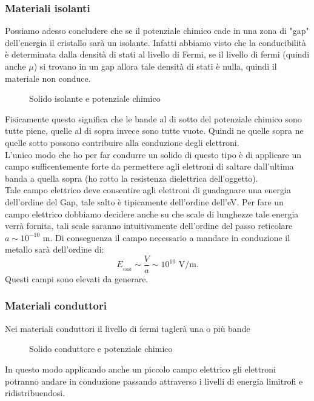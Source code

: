 \subsubsection{Materiali isolanti}
\label{subsubsec:Materiali isolanti}
Possiamo adesso concludere che se il potenziale chimico cade in una zona di "gap" dell'energia il cristallo sarà un isolante. Infatti abbiamo visto che la conducibilità è determinata dalla densità di stati al livello di Fermi, se il livello di fermi (quindi anche $\mu$) si trovano in un gap allora tale densità di stati è nulla, quindi il materiale non conduce. 
\begin{figure}[ht]
    \centering
    \caption{Solido isolante e potenziale chimico}
    \label{fig:solido-isolante-e-potenziale-chimico}
\end{figure}
Fisicamente questo significa che le bande al di sotto del potenziale chimico sono tutte piene, quelle al di sopra invece sono tutte vuote. Quindi ne quelle sopra ne quelle sotto possono contribuire alla conduzione degli elettroni. \\ 
L'unico modo che ho per far condurre un solido di questo tipo è di applicare un campo sufficentemente forte da permettere agli elettroni di saltare dall'ultima banda a quella sopra (ho rotto la resistenza dielettrica dell'oggetto). \\
Tale campo elettrico deve consentire agli elettroni di guadagnare una energia dell'ordine del Gap, tale salto è tipicamente dell'ordine dell'eV. Per fare un campo elettrico dobbiamo decidere anche su che scale di lunghezze tale energia verrà fornita, tali scale saranno intuitivamente dell'ordine del passo reticolare $a \sim 10^{-10}$ m. Di conseguenza il campo necessario a mandare in conduzione il metallo sarà dell'ordine di:
\[
	E_{_{\text{cond}}} \sim \frac{V}{a} \sim 10^10 \text{ V/m}
.\] 
Questi campi sono elevati da generare.
\subsubsection{Materiali conduttori}
\label{subsubsec:Materiali conduttori}
Nei materiali conduttori il livello di fermi taglerà una o più bande
\begin{figure}[ht]
    \centering
    \caption{Solido conduttore e potenziale chimico}
    \label{fig:solido-conduttore-e-potenziale-chimico}
\end{figure}
In questo modo applicando anche un piccolo campo elettrico gli elettroni potranno andare in conduzione passando attraverso i livelli di energia limitrofi e ridistribuendosi.
